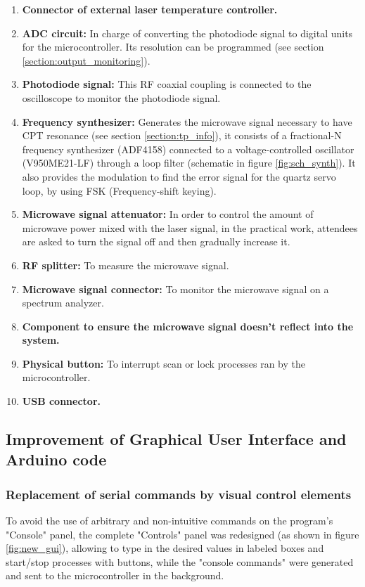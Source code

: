 \documentclass[a4paper,12pt]{article}
\begin{document}
\begin{enumerate}[wide, labelwidth=!, labelindent=0pt]
    \item \textbf{Connector of external laser temperature controller.}
    \item \textbf{ADC circuit:} In charge of converting the photodiode signal to digital units for the microcontroller. Its resolution can be programmed (see section \ref{section:output_monitoring}).
    \item \textbf{Photodiode signal: } This RF coaxial coupling is connected to the oscilloscope to monitor the photodiode signal.
    \item \textbf{Frequency synthesizer: } Generates the microwave signal necessary to have CPT resonance (see section \ref{section:tp_info}), it consists of a fractional-N frequency synthesizer (ADF4158) connected to a voltage-controlled oscillator (V950ME21-LF) through a loop filter (schematic in figure \ref{fig:sch_synth}). It also provides the modulation to find the error signal for the quartz servo loop, by using FSK (Frequency-shift keying). 
    \item \textbf{Microwave signal attenuator:} In order to control the amount of microwave power mixed with the laser signal, in the practical work, attendees are asked to turn the signal off and then gradually increase it.
    \item \textbf{RF splitter:} To measure the microwave signal.
    \item \textbf{Microwave signal connector: } To monitor the microwave signal on a spectrum analyzer.
    \item \textbf{Component to ensure the microwave signal doesn't reflect into the system.}
    \item \textbf{Physical button:} To interrupt scan or lock processes ran by the microcontroller.
    \item \textbf{USB connector.}
\end{enumerate}

\newpage
\subsection{Improvement of Graphical User Interface and Arduino code}

\subsubsection{Replacement of serial commands by visual control elements}
\label{section:replacement_serial}

To avoid the use of arbitrary and non-intuitive commands on the program's "Console" panel, the complete "Controls" panel was redesigned (as shown in figure \ref{fig:new_gui}), allowing to type in the desired values in labeled boxes and start\slash stop processes with buttons, while the "console commands" were generated and sent to the microcontroller in the background. 
\end{document}
